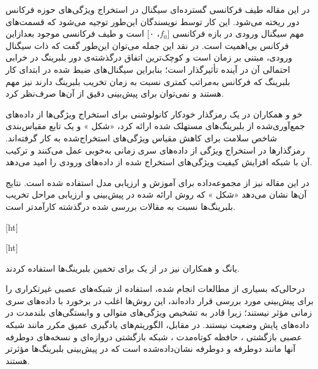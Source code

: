  در این مقاله طیف فرکانسی گسترده‌ای سیگنال در استخراج ویژگی‌های حوزه فرکانس دور ریخته می‌شود. این کار توسط نویسندگان این‌طور توجیه می‌شود که قسمت‌های مهم سیگنال ورودی در بازه فرکانسی [$f_0$، ۰] است و طیف فرکانسی موجود بعدازاین فرکانس بی‌اهمیت است. در نقد این جمله می‌توان این‌طور گفت که ذات سیگنال ورودی، مبتنی بر زمان است و کوچک‌ترین اتفاق درگذشته‌ی دور بلبرینگ در خرابی احتمالی آن در آینده تأثیرگذار است؛ بنابراین سیگنال‌های ضبط شده در ابتدای کار بلبرینگ که فرکانس به‌مراتب کمتری نسبت به زمان تخریب بلبرینگ دارند نیز مهم هستند و نمی‌توان برای پیش‌بینی دقیق از آن‌ها صرف‌نظر کرد.




خو و همکاران در  یک رمزگذار خودکار کانولوشنی برای استخراج ویژگی‌ها از داده‌های جمع‌آوری‌شده از بلبرینگ‌های مستهلک شده ارائه کرد، «شکل » و یک تابع مقیاس‌بندی شاخص سلامت برای کاهش مقیاس ویژگی‌های استخراج‌شده به کار گرفته‌اند. رمزگذارها در استخراج ویژگی از داده‌های سری زمانی به‌خوبی عمل می‌کنند و ترکیب آن با شبکه  افزایش کیفیت ویژگی‌های استخراج شده از داده‌های ورودی را امید می‌دهد.

در این مقاله نیز از مجموعه‌داده  برای آموزش و ارزیابی مدل استفاده شده است. نتایج آن‌ها نشان می‌دهد «شکل » که روش ارائه شده در پیش‌بینی  و ارزیابی مراحل تخریب بلبرینگ‌ها نسبت به مقالات بررسی شده درگذشته کارآمدتر است. 


[ht]



[ht]


یانگ و همکاران نیز در  از یک  برای تخمین  بلبرینگ‌ها استفاده کردند.



درحالی‌که بسیاری از مطالعات انجام شده، استفاده از شبکه‌های عصبی غیرتکراری را برای پیش‌بینی  مورد بررسی قرار داده‌اند، این روش‌ها اغلب در برخورد با داده‌های سری زمانی مؤثر نیستند؛ زیرا قادر به تشخیص ویژگی‌های متوالی و وابستگی‌های بلندمدت در داده‌های پایش وضعیت نیستند. در مقابل، الگوریتم‌های یادگیری عمیق مکرر مانند شبکه عصبی بازگشتی ، حافظه کوتاه‌مدت ، شبکه بازگشتی دروازه‌ای  و نسخه‌های دوطرفه آنها مانند  دوطرفه  و  دوطرفه نشان‌داده‌شده است که در پیش‌بینی  بلبرینگ‌ها مؤثرتر هستند. 





